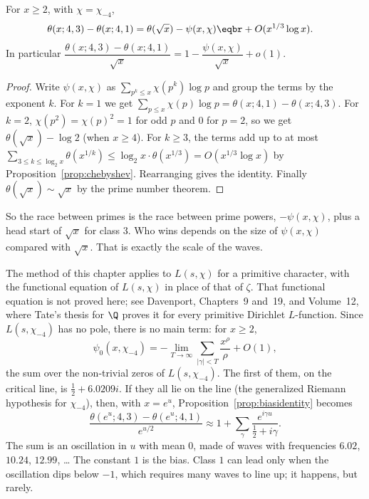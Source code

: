 \begin{proposition}\label{prop:biasidentity}
For $x\ge2$, with $\chi=\chi_{-4}$,
\[
\begin{aligned}\theta(x;4,3)-\theta(x;4,1)&=\theta(\sqrt x)-\psi(x,\chi)\eqbr+O(x^{1/3}\log x).\end{aligned}
\]
In particular $\dfrac{\theta(x;4,3)-\theta(x;4,1)}{\sqrt x}=1-\dfrac{\psi(x,\chi)}{\sqrt x}+o(1)$.
\end{proposition}
\begin{proof}
Write $\psi(x,\chi)$ as $\sum_{p^k\le x}\chi(p^k)\log p$ and group the terms by the exponent $k$. For $k=1$ we get $\sum_{p\le x}\chi(p)\log p=\theta(x;4,1)-\theta(x;4,3)$. For $k=2$, $\chi(p^2)=\chi(p)^2=1$ for odd $p$ and
$0$ for $p=2$, so we get $\theta(\sqrt x)-\log2$ (when $x\ge4$). For $k\ge3$, the terms add up to at most $\sum_{3\le k\le\log_2x}\theta(x^{1/k})\le\log_2x\cdot\theta(x^{1/3})=O(x^{1/3}\log x)$ by
Proposition~\ref{prop:chebyshev}. Rearranging gives the identity. Finally $\theta(\sqrt x)\sim\sqrt x$ by the prime number theorem.
\end{proof}

So the race between primes is the race between prime powers, $-\psi(x,\chi)$, plus a head start of $\sqrt x$ for class $3$. Who wins depends on the size of $\psi(x,\chi)$ compared with $\sqrt x$.
That is exactly the scale of the waves.

\begin{remark}
The method of this chapter applies to $L(s,\chi)$ for a primitive character, with the functional equation of $L(s,\chi)$ in place of that of $\zeta$. That functional equation is not proved here; see Davenport, Chapters~9 and~19, and Volume~12, where Tate's thesis for $\Q$ proves it for every primitive Dirichlet $L$-function. Since $L(s,\chi_{-4})$ has
no pole, there is no main term: for $x\ge2$,
\[
\psi_0(x,\chi_{-4})=-\lim_{T\to\infty}\sum_{|\gamma|<T}\frac{x^\rho}\rho+O(1),
\]
the sum over the non-trivial zeros of $L(s,\chi_{-4})$. The first of them, on the critical line, is $\frac12+6.0209i$. If they all lie on the line (the generalized Riemann hypothesis for $\chi_{-4}$), then,
with $x=e^u$, Proposition~\ref{prop:biasidentity} becomes
\[
\frac{\theta(e^u;4,3)-\theta(e^u;4,1)}{e^{u/2}}\approx1+\sum_\gamma\frac{e^{i\gamma u}}{\frac12+i\gamma}.
\]
The sum is an oscillation in $u$ with mean $0$, made of waves with frequencies $6.02$, $10.24$, $12.99$, \dots{} The constant $1$ is the bias. Class $1$ can lead only when the oscillation dips below $-1$,
which requires many waves to line up; it happens, but rarely.
\end{remark}

